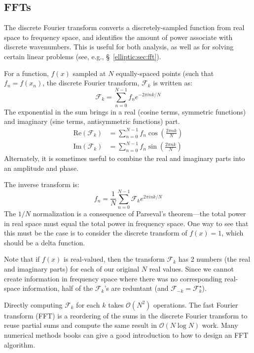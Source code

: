 \subsection{FFTs}

The discrete Fourier transform converts a discretely-sampled function
from real space to frequency space, and identifies the amount of power
associate with discrete wavenumbers.  This is useful for both
analysis, as well as for solving certain linear problems (see, e.g.,
\S~\ref{elliptic:sec:fft}).

For a function, $f(x)$ sampled at $N$ equally-spaced points (such that
$f_n = f(x_n)$, the discrete Fourier transform, $\mathcal{F}_k$ is
written as:
\begin{equation}
\mathcal{F}_k = \sum_{n=0}^{N-1} f_n e^{-2\pi i n k /N}
\end{equation}
The exponential in the sum brings in a real (cosine terms, symmetric
functions) and imaginary (sine terms, antisymmetric functions) part.
\begin{align}
\mathrm{Re}(\mathcal{F}_k) &= \sum_{n=0}^{N-1} f_n \cos\left(\frac{2\pi n k}{N}\right) \\
\mathrm{Im}(\mathcal{F}_k) &= \sum_{n=0}^{N-1} f_n \sin\left(\frac{2\pi n k}{N}\right)
\end{align}
Alternately, it is sometimes useful to combine the real and imaginary
parts into an amplitude and phase.

The inverse transform is:
\begin{equation}
f_n = \frac{1}{N} \sum_{n=0}^{N-1} \mathcal{F}_k e^{2\pi i n k /N}
\end{equation}
The $1/N$ normalization is a consequence of Parseval's theorem---the
total power in real space must equal the total power in frequency
space.  One way to see that this must be the case is to consider the
discrete transform of $f(x) = 1$, which should be a delta function.

Note that if $f(x)$ is real-valued, then the transform $\mathcal{F}_k$
has 2 numbers (the real and imaginary parts) for each of our original
$N$ real values.  Since we cannot create information in frequency
space where there was no corresponding real-space information, half of
the $\mathcal{F}_k$'s are reduntant (and $\mathcal{F}_{-k} =
\mathcal{F}^\star_k$).

Directly computing $\mathcal{F}_k$ for each $k$ takes $\mathcal{O}(N^2)$
operations.  The fast Fourier transform (FFT) is a reordering of the
sums in the discrete Fourier transform to reuse partial sums and compute
the same result in $\mathcal{O}(N\log N)$ work.  Many numerical methods
books can give a good introduction to how to design an FFT algorithm.

